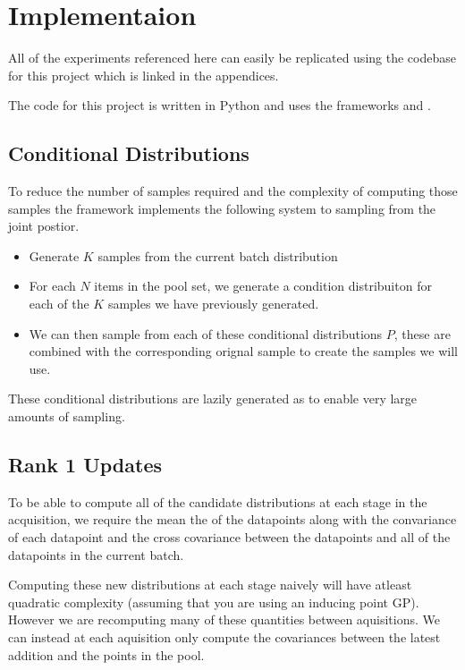 \documentclass[12pt, a4paper]{report}
\theoremstyle{definition}
\begin{document}
\chapter{Implementaion}
\label{Chap6}

All of the experiments referenced here can easily be replicated using the codebase for this project which is linked in the appendices.

The code for this project is written in Python and uses the frameworks \cite[Pytorch]{NEURIPS2019_9015} and \cite[GPytorch]{gardner2018gpytorch}.


\section{Conditional Distributions}
To reduce the number of samples required and the complexity of computing those samples the framework implements the following system to sampling from the joint postior.

\begin{itemize}
    \item Generate $K$ samples from the current batch distribution
    \item For each $N$ items in the pool set, we generate a condition distribuiton for each of the $K$ samples we have previously generated.
    \item We can then sample from each of these conditional distributions $P$, these are combined with the corresponding orignal sample to create the samples we will use.
\end{itemize}

These conditional distributions are lazily generated as to enable very large amounts of sampling.

\section{Rank 1 Updates}
To be able to compute all of the candidate distributions at each stage in the acquisition, we require the mean the of the datapoints along with the convariance of each datapoint and the cross covariance between the datapoints and all of the datapoints in the current batch.

Computing these new distributions at each stage naively will have atleast quadratic complexity (assuming that you are using an inducing point GP). However we are recomputing many of these quantities between aquisitions. We can instead at each aquisition only compute the covariances between the latest addition and the points in the pool.
\end{document}
